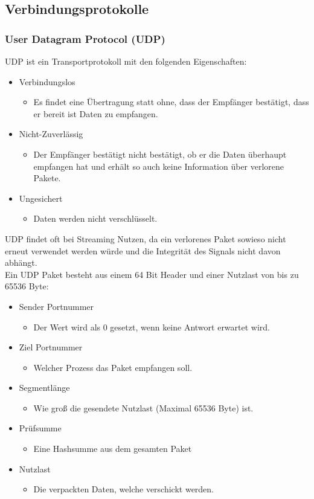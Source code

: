\documentclass{article}
\begin{document}
	 \subsection{Verbindungsprotokolle}
	 \subsubsection{User Datagram Protocol (UDP)}
	 UDP ist ein Transportprotokoll mit den folgenden Eigenschaften:
	 \begin{itemize}
	 	\item{Verbindungslos}
	 	\begin{itemize}
	 		\item{Es findet eine Übertragung statt ohne, dass der Empfänger bestätigt, dass er bereit ist Daten zu empfangen.}
	 	\end{itemize}
	 	\item{Nicht-Zuverlässig}
	 	\begin{itemize}
	 		\item{Der Empfänger bestätigt nicht bestätigt, ob er die Daten überhaupt empfangen hat und erhält so auch keine Information über verlorene Pakete.}
	 	\end{itemize}
	 	\item{Ungesichert}
	 	\begin{itemize}
	 		\item{Daten werden nicht verschlüsselt.}
	 	\end{itemize}
	 \end{itemize}
	 UDP findet oft bei Streaming Nutzen, da ein verlorenes Paket sowieso nicht erneut verwendet werden würde und die Integrität des Signals nicht davon abhängt. \\
	 Ein UDP Paket besteht aus einem 64 Bit Header und einer Nutzlast von bis zu 65536 Byte:
	 \begin{itemize}
	 	\item{Sender Portnummer}
	 	\begin{itemize}
	 		\item{Der Wert wird als 0 gesetzt, wenn keine Antwort erwartet wird.}
	 	\end{itemize}
	 	\item{Ziel Portnummer}
	 	\begin{itemize}
	 		\item{Welcher Prozess das Paket empfangen soll.}
	 	\end{itemize}
	 	\item{Segmentlänge}
	 	\begin{itemize}
	 		\item{Wie groß die gesendete Nutzlast (Maximal 65536 Byte) ist.}
	 	\end{itemize}
	 	\item{Prüfsumme}
	 	\begin{itemize}
	 		\item{Eine Hashsumme aus dem gesamten Paket}
	 	\end{itemize}
	 	\item{Nutzlast}
	 	\begin{itemize}
	 		\item{Die verpackten Daten, welche verschickt werden.}
	 	\end{itemize}
	 \end{itemize}
\end{document}
